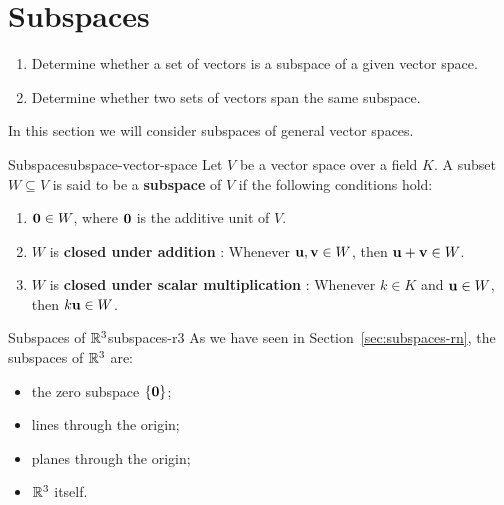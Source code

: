 \section{Subspaces}
\label{sec:vector-space-subspaces}

\begin{outcome}
  \begin{enumerate}
  \item Determine whether a set of vectors is a subspace of a given
    vector space.
  \item Determine whether two sets of vectors span the same subspace.
  \end{enumerate}
\end{outcome}

In this section we will consider subspaces of general vector spaces.

\begin{definition}{Subspace}{subspace-vector-space}
  Let $V$ be a vector space over a field $K$. A subset $W\subseteq V$
  is said to be a \textbf{subspace} of\/ $V$ if the
  following conditions hold:
  \begin{enumerate}
  \item $\mbox{\bf 0}\in W$, where $\mbox{\bf 0}$ is the additive unit of\/ $V$.
  \item $W$ is \textbf{closed under addition}%
    : Whenever $\mbox{\bf u}, \mbox{\bf v}\in W$,
    then $\mbox{\bf u} + \mbox{\bf v}\in W$.
  \item $W$ is \textbf{closed under scalar multiplication}%
    : Whenever $k\in K$ and
    $\mbox{\bf u}\in W$, then $k\mbox{\bf u}\in W$.
  \end{enumerate}
\end{definition}

\begin{example}{Subspaces of $\mathbb{R}^3$}{subspaces-r3}
  As we have seen in Section~\ref{sec:subspaces-rn}, the subspaces of
  $\mathbb{R}^3$ are:
  \begin{itemize}
  \item the zero subspace%
     $\left\{\mbox{\bf 0}\right\}$;
  \item lines through the origin;
  \item planes through the origin;
  \item $\mathbb{R}^3$ itself.
  \end{itemize}
\end{example}

